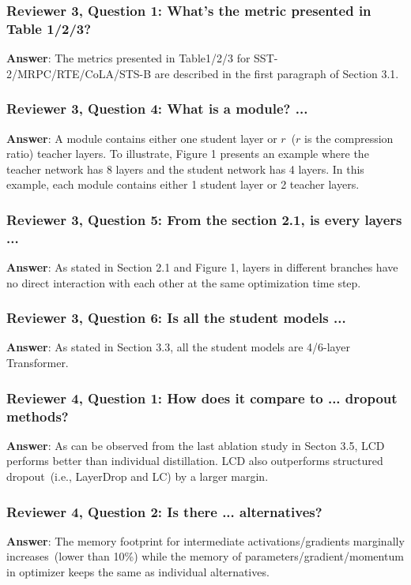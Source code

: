 \documentclass{article}
\begin{document}
\subsubsection*{Reviewer 3, Question 1: What's the metric presented in Table 1/2/3?}

\textbf{Answer}: The metrics presented in Table1/2/3 for SST-2/MRPC/RTE/CoLA/STS-B are described in the first paragraph of Section 3.1. 
\noindent
\subsubsection*{Reviewer 3, Question 4: What is a module? ...}
\textbf{Answer}: A module contains either one student layer or $r$~($r$ is the compression ratio) teacher layers. To illustrate, Figure 1 presents an example where the teacher network has 8 layers and the student network has 4 layers. In this example, each module contains either 1 student layer or 2 teacher layers.
\noindent
\subsubsection*{Reviewer 3, Question 5: From the section 2.1, is every layers ...} 
\textbf{Answer}: As stated in Section 2.1 and Figure 1, layers in different branches have no direct interaction with each other at the same optimization time step. 
\subsubsection*{Reviewer 3, Question 6: Is all the student models ...}
\textbf{Answer}: As stated in Section 3.3, all the student models are 4/6-layer Transformer.


\subsubsection*{Reviewer 4, Question 1: How does it compare to ... dropout methods?}
\noindent
\textbf{Answer}: As can be observed from the last ablation study in Secton 3.5, LCD performs better than individual distillation. LCD also outperforms structured dropout~(i.e., LayerDrop and LC) by a larger margin.
\subsubsection*{Reviewer 4, Question 2: Is there ... alternatives?}
\textbf{Answer}: The memory footprint for intermediate activations/gradients marginally increases~(lower than 10\%) while the memory of parameters/gradient/momentum in optimizer keeps the same as individual alternatives.
\end{document}
